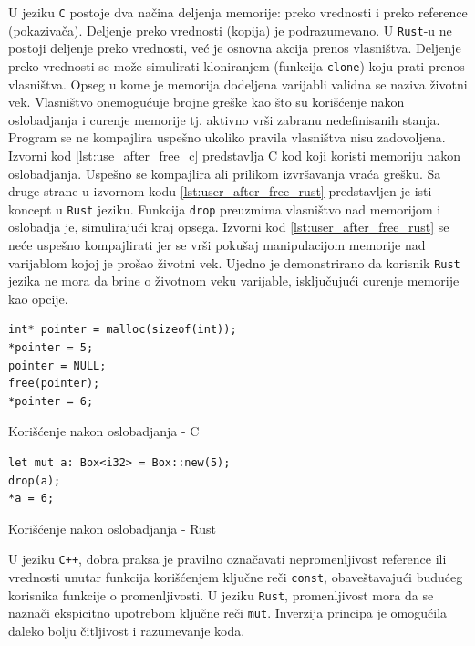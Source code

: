 U jeziku \verb|C| postoje dva načina deljenja 
memorije: preko vrednosti i preko reference (pokazivača). Deljenje preko vrednosti (kopija) je
podrazumevano. U \verb|Rust|-u ne postoji deljenje preko vrednosti, već je osnovna akcija prenos vlasništva.
Deljenje preko vrednosti se može simulirati kloniranjem (funkcija \verb|clone|) koju prati prenos vlasništva.
Opseg u kome je memorija dodeljena varijabli validna 
se naziva životni vek. Vlasništvo onemogućuje brojne greške kao što su korišćenje nakon oslobadjanja i curenje 
memorije tj. aktivno vrši zabranu nedefinisanih stanja. Program se ne kompajlira uspešno ukoliko pravila 
vlasništva nisu zadovoljena. Izvorni kod \ref{lst:use_after_free_c} predstavlja C kod koji koristi memoriju 
nakon oslobadjanja. Uspešno se kompajlira ali prilikom izvršavanja vraća grešku. Sa druge strane u izvornom 
kodu \ref{lst:user_after_free_rust} predstavljen je isti koncept u \verb|Rust| jeziku. Funkcija 
\verb|drop| preuzmima vlasništvo nad memorijom 
i oslobadja je, simulirajući kraj opsega. Izvorni kod \ref{lst:user_after_free_rust} se neće 
uspešno kompajlirati jer se vrši pokušaj manipulacijom memorije nad varijablom kojoj je prošao životni vek.
Ujedno je demonstrirano da korisnik \verb|Rust| jezika ne mora da brine o životnom veku varijable, isključujući
curenje memorije kao opcije.

\begin{multicols}{2}
    \begin{listing}[H]
    \begin{verbatim}
int* pointer = malloc(sizeof(int));
*pointer = 5;
pointer = NULL;
free(pointer);
*pointer = 6; 
    \end{verbatim}
    \caption{Korišćenje nakon oslobadjanja - C}
    \label{lst:use_after_free_c}
    \end{listing}
    \columnbreak
    \begin{listing}[H]
    \begin{verbatim}
let mut a: Box<i32> = Box::new(5);
drop(a);
*a = 6;
    \end{verbatim}
    \caption{Korišćenje nakon oslobadjanja - Rust}
    \label{lst:user_after_free_rust}
    \end{listing}
\end{multicols}

U jeziku \verb|C++|, dobra praksa je pravilno označavati nepromenljivost reference ili vrednosti
unutar funkcija korišćenjem ključne reči \verb|const|, obaveštavajući budućeg korisnika funkcije 
o promenljivosti. U jeziku \verb|Rust|, promenljivost mora da se naznači ekspicitno upotrebom ključne 
reči \verb|mut|. Inverzija principa je omogućila daleko bolju čitljivost i razumevanje koda.

